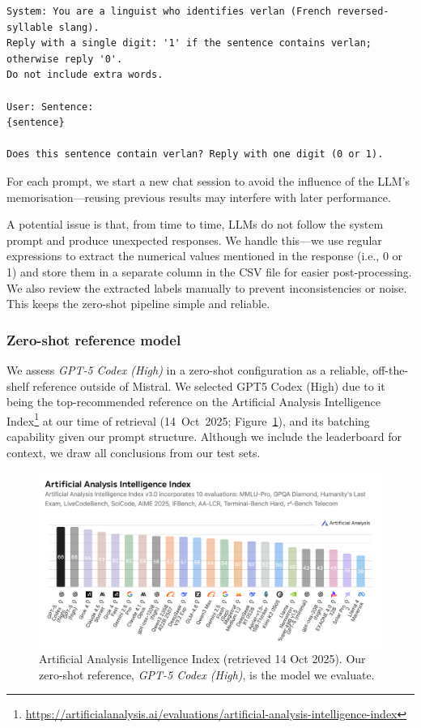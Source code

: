 \documentclass[12pt]{article}
\begin{document}
\begin{lstlisting}
System: You are a linguist who identifies verlan (French reversed-syllable slang).
Reply with a single digit: '1' if the sentence contains verlan; otherwise reply '0'.
Do not include extra words.

User: Sentence:
{sentence}

Does this sentence contain verlan? Reply with one digit (0 or 1).
\end{lstlisting}

For each prompt, we start a new chat session to avoid the influence of the LLM's memorisation\;---\;reusing previous results may interfere with later performance.

A potential issue is that, from time to time, LLMs do not follow the system prompt and produce unexpected responses. We handle this\;---\;we use regular expressions to extract the numerical values mentioned in the response (i.e., 0 or 1) and store them in a separate column in the CSV file for easier post-processing. We also review the extracted labels manually to prevent inconsistencies or noise. This keeps the zero-shot pipeline simple and reliable.

%
\subsubsection{Zero-shot reference model}

We assess \textit{GPT-5 Codex (High)} in a zero-shot configuration as a reliable, off-the-shelf reference outside of Mistral. We selected GPT5 Codex (High) due to it being the top-recommended reference on the Artificial Analysis Intelligence Index\footnote{\url{https://artificialanalysis.ai/evaluations/artificial-analysis-intelligence-index}} at our time of retrieval (14~Oct~2025; Figure~\ref{fig:AI_Index}), and its batching capability given our prompt structure. Although we include the leaderboard for context, we draw all conclusions from our test sets.

\begin{figure}[H]
\centering
\includegraphics[width=\textwidth]{figures/Artificial Analysis Intelligence Index (14 Oct '25) .png}
\caption{\label{fig:AI_Index}Artificial Analysis Intelligence Index (retrieved 14 Oct 2025). Our zero-shot reference, \textit{GPT-5 Codex (High)}, is the model we evaluate.}
\end{figure}
\end{document}
